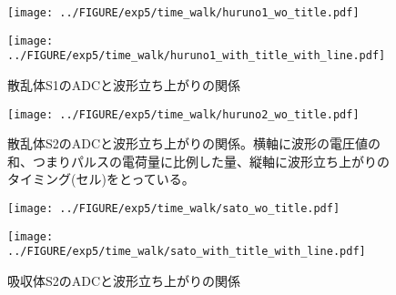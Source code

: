 \documentclass[../../main.tex]{subfiles}
\numberwithin{equation}{section}
\numberwithin{table}{section}
\numberwithin{figure}{section}
\begin{document}
    \begin{figure}[tbp]
      \begin{minipage}[b]{0.48\columnwidth}
        \centering
        \texttt{[image: ../FIGURE/exp5/time\_walk/huruno1\_wo\_title.pdf]}
        \label{fig:exp5_adc_time01}
      \end{minipage}
      \hspace{0.04\columnwidth} %
      \begin{minipage}[b]{0.48\columnwidth}
        \centering
        \texttt{[image: ../FIGURE/exp5/time\_walk/huruno1\_with\_title\_with\_line.pdf]}
        \label{fig:exp5_adc_time02}
      \end{minipage}
      \caption{散乱体S1のADCと波形立ち上がりの関係}\label{fig:exp5_adc_time_huruno1}
    \end{figure}

    \begin{figure}[tbp]
      \centering
      \texttt{[image: ../FIGURE/exp5/time\_walk/huruno2\_wo\_title.pdf]}

      \caption{散乱体S2のADCと波形立ち上がりの関係。横軸に波形の電圧値の和、つまりパルスの電荷量に比例した量、縦軸に波形立ち上がりのタイミング(セル)をとっている。}\label{fig:exp5_adc_time_huruno2}
    \end{figure}

    \begin{figure}[tbp]
      \begin{minipage}[b]{0.48\columnwidth}
        \centering
        \texttt{[image: ../FIGURE/exp5/time\_walk/sato\_wo\_title.pdf]}
        \label{fig:exp5_adc_time03}
      \end{minipage}
      \hspace{0.04\columnwidth} %
      \begin{minipage}[b]{0.48\columnwidth}
        \centering
        \texttt{[image: ../FIGURE/exp5/time\_walk/sato\_with\_title\_with\_line.pdf]}
        \label{fig:exp5_adc_time04}
      \end{minipage}
      \caption{吸収体S2のADCと波形立ち上がりの関係}\label{fig:exp5_adc_time_sato}
    \end{figure}
\end{document}
